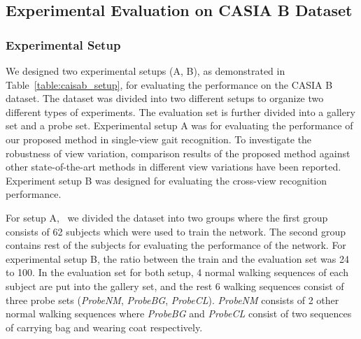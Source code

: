 \subsection{Experimental Evaluation on CASIA B Dataset}
\subsubsection{Experimental Setup}
We designed two experimental setups (A, B), as demonstrated in Table~\ref{table:caisab_setup}, for evaluating the performance on the CASIA B dataset. The dataset was divided into two different setups to organize two different types of experiments. The evaluation set is further divided into a gallery set and a probe set. Experimental setup A was for evaluating the performance of our proposed method in single-view gait recognition. To investigate the robustness of view variation, comparison results of the proposed method against other state-of-the-art methods in different view variations have been reported. Experiment setup B was designed for evaluating the cross-view recognition performance. 

For setup A,  we divided the dataset into two groups where the first group consists of 62 subjects which were used to train the network. The second group contains rest of the subjects for evaluating the performance of the network. For experimental setup B, the ratio between the train and the evaluation set was 24 to 100. In the evaluation set for both setup, 4 normal walking sequences of each subject are put into the gallery set, and the rest 6 walking sequences consist of three probe sets (\textit{ProbeNM}, \textit{ProbeBG}, \textit{ProbeCL}). \textit{ProbeNM} consists of 2 other normal walking sequences where \textit{ProbeBG} and \textit{ProbeCL} consist of two sequences of carrying bag and wearing coat respectively.

